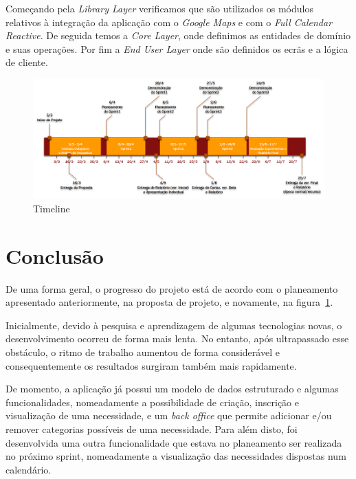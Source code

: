 \documentclass[a4paper,openright,11pt]{report}
\begin{document}
Começando pela \textit{Library Layer} verificamos que são utilizados os módulos relativos à integração da aplicação 
com o \textit{Google Maps} e com o \textit{Full Calendar Reactive}. De seguida temos a \textit{ Core Layer}, 
onde definimos as entidades de domínio e suas operações. Por fim a \textit{ End User Layer} onde são definidos 
os ecrãs e a lógica de cliente. 

\begin{figure}[H]
  \centering 
  \includegraphics[scale=0.4]{figures/Timeline.png}
  \caption{Timeline}\label{fig:timeline}
\end{figure}

\section*{Conclusão}\label{sec:conclusion}

De uma forma geral, o progresso do projeto está de acordo com o planeamento apresentado anteriormente, na proposta de projeto, e novamente, na figura~\ref{fig:timeline}.

Inicialmente, devido à pesquisa e aprendizagem de algumas tecnologias novas, o desenvolvimento ocorreu de forma mais lenta. 
No entanto, após ultrapassado esse obstáculo, o ritmo de trabalho aumentou de forma considerável e consequentemente os resultados surgiram também mais rapidamente. 

De momento, a aplicação já possui um modelo de dados estruturado e algumas funcionalidades, nomeadamente a possibilidade de criação, 
inscrição e visualização de uma necessidade, e um \textit{back office} que permite adicionar e/ou remover categorias possíveis de uma necessidade. 
Para além disto, foi desenvolvida uma outra funcionalidade que estava no planeamento ser realizada no próximo sprint, nomeadamente a visualização das necessidades dispostas num calendário.
\end{document}
